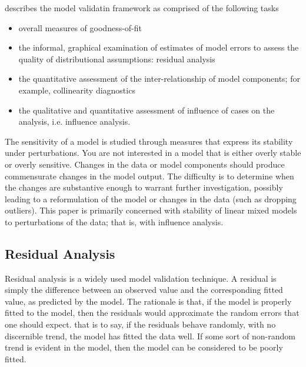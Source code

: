 \documentclass[12pt, a4paper]{article}
\begin{document}
\citet{schab} describes the model validatin framework as comprised of the following tasks

\begin{itemize}
	\item  overall measures of goodness-of-fit
	\item the informal, graphical examination of estimates of model errors to assess the quality of distributional
	assumptions: residual analysis
	
	
	\item the quantitative assessment of the inter-relationship of model components; for example, collinearity 	diagnostics
	\item the qualitative and quantitative assessment of influence of cases on the analysis, i.e. influence analysis.
\end{itemize}

The sensitivity of a model is studied through measures that express its stability under perturbations. You
are not interested in a model that is either overly stable or overly sensitive. Changes in the data or model
components should produce commensurate changes in the model output. The difficulty is to determine
when the changes are substantive enough to warrant further investigation, possibly leading to a reformulation
of the model or changes in the data (such as dropping outliers). This paper is primarily concerned
with stability of linear mixed models to perturbations of the data; that is, with influence analysis. 
\newpage
\subsection{Residual Analysis}

Residual analysis is a widely used model validation technique. A residual is simply the difference between an observed value and the corresponding fitted value, as predicted by the model. The rationale is that, if the model is properly fitted to the model, then the residuals would approximate the random errors that one should expect.
that is to say, if the residuals behave randomly, with no discernible trend, the model has fitted the data well. If some sort of non-random trend is evident in the model, then the model can be considered to be poorly fitted.
\end{document}
